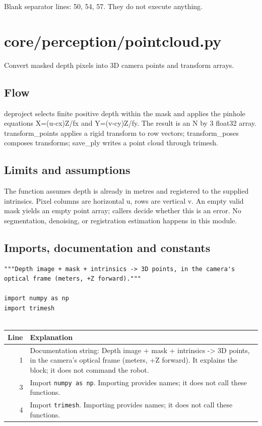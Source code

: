 \documentclass[11pt,a4paper]{book}
\begin{document}
Blank separator lines: 50, 54, 57. They do not execute anything.

\chapter{core/perception/pointcloud.py}

Convert masked depth pixels into 3D camera points and transform arrays.

\section*{Flow}

deproject selects finite positive depth within the mask and applies the pinhole equations X=(u-cx)Z/fx and Y=(v-cy)Z/fy. The result is an N by 3 float32 array. transform\_points applies a rigid transform to row vectors; transform\_poses composes transforms; save\_ply writes a point cloud through trimesh.

\section*{Limits and assumptions}

The function assumes depth is already in metres and registered to the supplied intrinsics. Pixel columns are horizontal u, rows are vertical v. An empty valid mask yields an empty point array; callers decide whether this is an error. No segmentation, denoising, or registration estimation happens in this module.

\section{Imports, documentation and constants}

\begin{lstlisting}[firstnumber=1]
"""Depth image + mask + intrinsics -> 3D points, in the camera's optical frame (meters, +Z forward)."""

import numpy as np
import trimesh


\end{lstlisting}

\begin{longtable}{r p{}}

\textbf{Line} & \textbf{Explanation} \\ \hline \endhead

1 & Documentation string: Depth image + mask + intrinsics -> 3D points, in the camera's optical frame (meters, +Z forward). It explains the block; it does not command the robot. \\

3 & Import \texttt{numpy as np}. Importing provides names; it does not call these functions. \\

4 & Import \texttt{trimesh}. Importing provides names; it does not call these functions. \\

\end{longtable}
\end{document}
